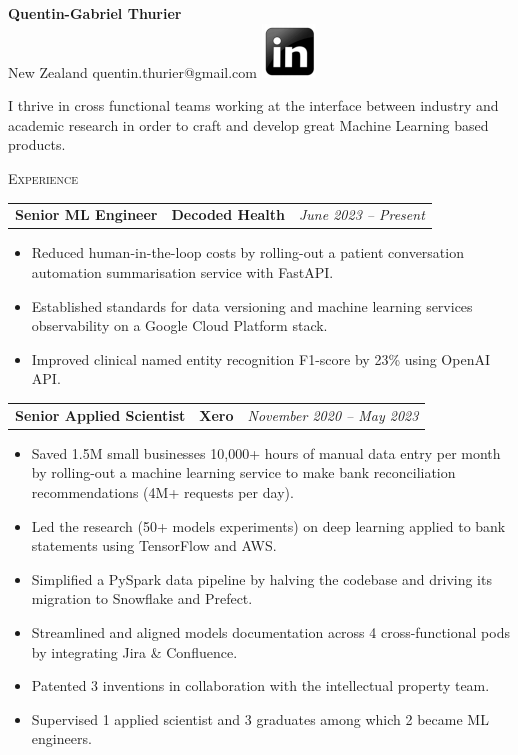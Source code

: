 \documentclass[letterpaper,11pt]{article}
\renewcommand{\section}[1]{{\vspace{0.3cm}}{\scshape\color{blue}#1}{\color{blue}\hrulefill}{\vspace{0.2cm}}}
\newcommand{\resumeItemListStart}{\begin{itemize}[label=$\circ$, topsep=0.1cm, parsep=0cm, partopsep=0cm, itemsep=0.1cm, leftmargin=0.4cm]}
\newcommand{\resumeItem}[1]{\item\small{#1}}
\newcommand{\resumeItemListEnd}{\end{itemize}}
\newcommand{\job}[4]{
    \begin{tabular}{p{7cm}p{6cm}p{5cm}}
      \hspace{-0.7em} \textbf{#1} & \textbf{\small{#2}} & \hfill \textit{\small{#4}}
    \end{tabular}
}
\begin{document}
 

\begin{center}
  \textbf{\Large Quentin-Gabriel Thurier} \\
  \small{New Zealand} \textbar{}
  \small{quentin.thurier@gmail.com} \textbar{}
  \href{https://www.linkedin.com/in/quentin-gabriel-thurier-36586021/}{\includegraphics[scale=0.6,valign=b]{linkedin}} %
\end{center}

I thrive in cross functional teams working at the interface between industry and academic research in order to craft and develop great Machine Learning based products. 

\section{Experience}

\job {Senior ML Engineer}{Decoded Health}{Auckland}{June 2023 -- Present}
\resumeItemListStart
\resumeItem {Reduced human-in-the-loop costs by rolling-out a patient conversation automation summarisation service with FastAPI.}
\resumeItem {Established standards for data versioning and machine learning services observability on a Google Cloud Platform stack.}
\resumeItem {Improved clinical named entity recognition F1-score by 23\% using OpenAI API.}
\resumeItemListEnd \vspace{0.2cm}

\job {Senior Applied Scientist}{Xero}{Auckland}{November 2020 -- May 2023}
\resumeItemListStart
\resumeItem {Saved 1.5M small businesses 10,000+ hours of manual data entry per month by rolling-out a machine learning service to make bank reconciliation recommendations (4M+ requests per day).}
\resumeItem {Led the research (50+ models experiments) on deep learning applied to bank statements using TensorFlow and AWS.}
\resumeItem {Simplified a PySpark data pipeline by halving the codebase and driving its migration to Snowflake and Prefect.}
\resumeItem {Streamlined and aligned models documentation across 4 cross-functional pods by integrating Jira \& Confluence.}
\resumeItem {Patented 3 inventions in collaboration with the intellectual property team.}
\resumeItem {Supervised 1 applied scientist and 3 graduates among which 2 became ML engineers.}
\resumeItemListEnd \vspace{0.2cm}
\end{document}
